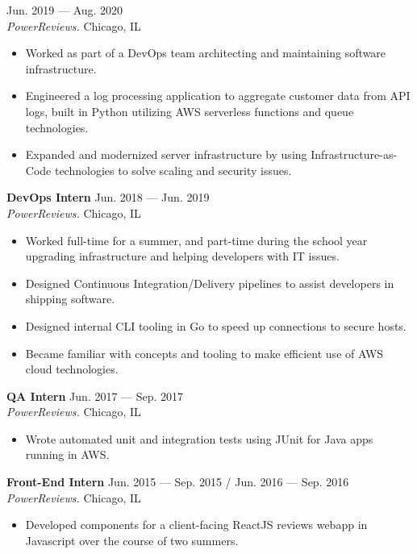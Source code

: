\documentclass[11pt]{article}
\begin{document}
 \hfill Jun. 2019 --- Aug. 2020 \\
{\sl PowerReviews.} Chicago, IL
\begin{itemize}[topsep=0pt] \itemsep -4pt
\item Worked as part of a DevOps team architecting and maintaining software infrastructure.
\item Engineered a log processing application to aggregate customer data from API logs, built in Python utilizing AWS serverless functions and queue technologies.
\item Expanded and modernized server infrastructure by using Infrastructure-as-Code technologies to solve scaling and security issues.
\end{itemize}

\noindent
{\bf DevOps Intern} \hfill Jun. 2018 --- Jun. 2019 \\
{\sl PowerReviews.} Chicago, IL
\begin{itemize}[topsep=0pt] \itemsep -4pt
\item Worked full-time for a summer, and part-time during the school year upgrading infrastructure and helping developers with IT issues. 
\item Designed Continuous Integration/Delivery pipelines to assist developers in shipping software.
\item Designed internal CLI tooling in Go to speed up connections to secure hosts.
\item Became familiar with concepts and tooling to make efficient use of AWS cloud technologies.
\end{itemize} 

\noindent
{\bf QA Intern} \hfill Jun. 2017 --- Sep. 2017 \\
{\sl PowerReviews.} Chicago, IL
\begin{itemize}[topsep=0pt] \itemsep -4pt
\item Wrote automated unit and integration tests using JUnit for Java apps running in AWS. 
\end{itemize} 

\noindent
{\bf Front-End Intern} \hfill Jun. 2015 --- Sep. 2015 / Jun. 2016 --- Sep. 2016\\
{\sl PowerReviews.} Chicago, IL
\begin{itemize}[topsep=0pt] \itemsep -4pt
\item Developed components for a client-facing ReactJS reviews webapp in Javascript over the course of two summers.
\end{itemize} 
\end{document}
